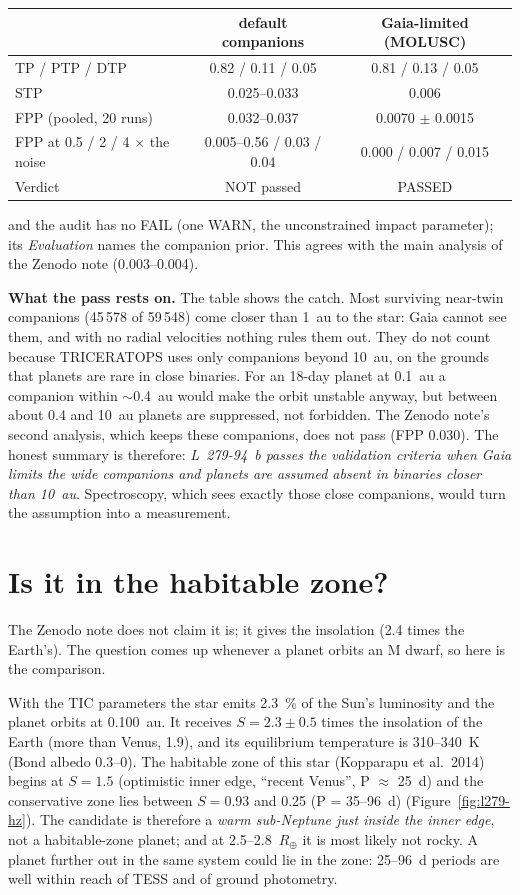 \begin{center}
\begin{tabular}{@{}lcc@{}}
\toprule
 & default companions & Gaia-limited (MOLUSC)\\
\midrule
TP / PTP / DTP & 0.82 / 0.11 / 0.05 & 0.81 / 0.13 / 0.05\\
STP & 0.025--0.033 & 0.006\\
FPP (pooled, 20 runs) & 0.032--0.037 & 0.0070 $\pm$ 0.0015\\
FPP at 0.5 / 2 / 4 $\times$ the noise & 0.005--0.56 / 0.03 / 0.04 & 0.000 / 0.007 / 0.015\\
Verdict & NOT passed & PASSED\\
\bottomrule
\end{tabular}
\end{center}

and the audit has no FAIL (one WARN, the unconstrained impact parameter);
its \emph{Evaluation} names the companion prior. This agrees with the main
analysis of the Zenodo note (0.003--0.004).

\textbf{What the pass rests on.} The table shows the catch. Most surviving
near-twin companions (45\,578 of 59\,548) come closer than 1~au to the
star: Gaia cannot see them, and with no radial velocities nothing rules
them out. They do not count because TRICERATOPS uses only companions
beyond 10~au, on the grounds that planets are rare in close binaries. For
an 18-day planet at 0.1~au a companion within $\sim$0.4~au would make the
orbit unstable anyway, but between about 0.4 and 10~au planets are
suppressed, not forbidden. The Zenodo note's second analysis, which keeps
these companions, does not pass (FPP 0.030). The honest summary is
therefore: \emph{L~279-94~b passes the validation criteria when Gaia limits
the wide companions and planets are assumed absent in binaries closer than
10~au}. Spectroscopy, which sees exactly those close companions, would turn
the assumption into a measurement.

\section*{Is it in the habitable zone?}

The Zenodo note does not claim it is; it gives the insolation (2.4 times
the Earth's). The question comes up whenever a planet orbits an M dwarf, so
here is the comparison.


With the TIC parameters the star emits 2.3~\% of the Sun's luminosity and
the planet orbits at 0.100~au. It receives
$S = 2.3 \pm 0.5$ times the insolation of the Earth (more than Venus,
1.9), and its equilibrium temperature is 310--340~K (Bond albedo 0.3--0).
The habitable zone of this star (Kopparapu et al.\ 2014) begins at
$S = 1.5$ (optimistic inner edge, ``recent Venus'', P $\approx$ 25~d) and
the conservative zone lies between $S = 0.93$ and 0.25 (P = 35--96~d)
(Figure~\ref{fig:l279-hz}). The candidate is therefore a \emph{warm
sub-Neptune just inside the inner edge}, not a habitable-zone planet; and at
2.5--2.8~$R_\oplus$ it is most likely not rocky. A planet further out in
the same system could lie in the zone: 25--96~d periods are well within
reach of TESS and of ground photometry.

